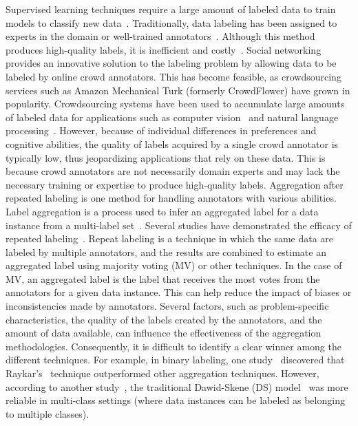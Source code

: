 \documentclass[pdflatex,bst/sn-basic]{bst/sn-jnl}%
\begin{document}
Supervised learning techniques require a large amount of labeled data to train models to classify new data~\cite{jiang_wrapper_2019,jiang_class_2019}. Traditionally, data labeling has been assigned to experts in the domain or well-trained annotators~\cite{tian_MaxMargin_2019}. Although this method produces high-quality labels, it is inefficient and costly~\cite{li_noise_2016,li_noise_2019}.  Social networking provides an innovative solution to the labeling problem by allowing data to be labeled by online crowd annotators. This has become feasible, as crowdsourcing services such as Amazon Mechanical Turk (formerly CrowdFlower) have grown in popularity. Crowdsourcing systems have been used to accumulate large amounts of labeled data for applications such as computer vision~\cite{deng_imagenet_2009,liu_Variational_2012} and natural language processing~\cite{karger_Budget_2014}. However, because of individual differences in preferences and cognitive abilities, the quality of labels acquired by a single crowd annotator is typically low, thus jeopardizing applications that rely on these data. This is because crowd annotators are not necessarily domain experts and may lack the necessary training or expertise to produce high-quality labels.
Aggregation after repeated labeling is one method for handling annotators with various abilities. Label aggregation is a process used to infer an aggregated label for a data instance from a multi-label set~\cite{sheshadri_SQUARE_2013}. Several studies have demonstrated the efficacy of repeated labeling~\cite{tu_multilabel_2018,zhang_multilabelinferencecrowdsourcing_2018}. Repeat labeling is a technique in which the same data are labeled by multiple annotators, and the results are combined to estimate an aggregated label using majority voting (MV) or other techniques. In the case of MV, an aggregated label is the label that receives the most votes from the annotators for a given data instance. This can help reduce the impact of biases or inconsistencies made by annotators. Several factors, such as problem-specific characteristics, the quality of the labels created by the annotators, and the amount of data available, can influence the effectiveness of the aggregation methodologies. Consequently, it is difficult to identify a clear winner among the different techniques. For example, in binary labeling, one study~\cite{sheshadri_SQUARE_2013} discovered that Raykar's~\cite{raykar_Learning_2010} technique outperformed other aggregation techniques. However, according to another study~\cite{zheng_Truth_2017}, the traditional Dawid-Skene (DS) model~\cite{dawid_Maximum_1979} was more reliable in multi-class settings (where data instances can be labeled as belonging to multiple classes).
\end{document}
